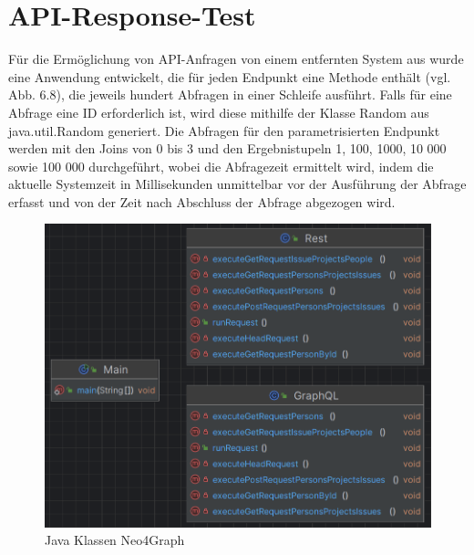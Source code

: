\section{API-Response-Test} %
\label{sec:test}
Für die Ermöglichung von API-Anfragen von einem entfernten System aus wurde eine Anwendung entwickelt, die für jeden Endpunkt eine Methode enthält (vgl. Abb. 6.8), die jeweils hundert Abfragen in einer Schleife ausführt. Falls für eine Abfrage eine ID erforderlich ist, wird diese mithilfe der Klasse Random aus java.util.Random generiert. Die Abfragen für den parametrisierten Endpunkt werden mit den Joins von 0 bis 3 und den Ergebnistupeln 1, 100, 1000, 10 000 sowie 100 000 durchgeführt, wobei die Abfragezeit ermittelt wird, indem die aktuelle Systemzeit in Millisekunden unmittelbar vor der Ausführung der Abfrage erfasst und von der Zeit nach Abschluss der Abfrage abgezogen wird.
\begin{figure}[H]
	\centering
	\includegraphics[scale=0.5]{Illustrations/apiresponsetest.png}
	\caption{Java Klassen Neo4Graph}
\end{figure}
